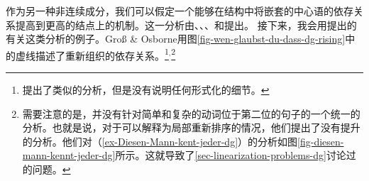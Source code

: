 作为另一种非连续成分，我们可以假定一个能够在结构中将嵌套的中心语的依存关系提高到更高的结点上的机制。这一分析由\citet{Kunze68a-u}、\citet{Hudson97a,Hudson2000a}、\citet{Kahane97a}、\citet{KNR98a}和\citet{GO2009a}提出。
接下来，我会用\citet{GO2009a}提出的有关这类分析的例子。Groß \& Osborne用图\vref{fig-wen-glaubst-du-dass-dg-rising}中的虚线描述了重新组织的依存关系。\footnote{
\citet[]{EH2003a}提出了类似的分析，但是没有说明任何形式化的细节。
}$^,$\footnote{
需要注意的是，\citet{GO2009a}并没有针对简单和复杂的动词位于第二位的句子的一个统一的分析。也就是说，对于可以解释为局部重新排序的情况，他们提出了没有提升的分析。他们对（\ref{ex-Diesen-Mann-kent-jeder-dg}）的分析如图\ref{fig-diesen-mann-kennt-jeder-dg}所示。这就导致了\ref{sec-linearization-problems-dg}讨论过的问题。
}
